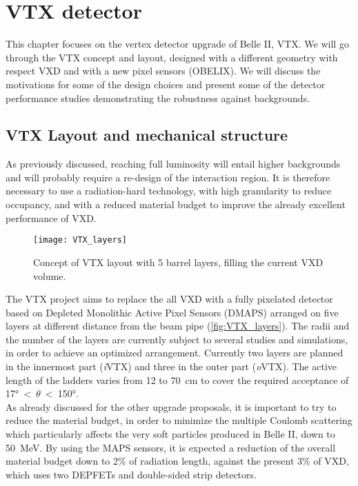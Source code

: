 \chapter{VTX detector} \label{ch:VTX}


This chapter focuses on the vertex detector upgrade of Belle II, VTX. We will go through the VTX concept and layout, designed with a different geometry with respect VXD and with a new pixel sensors (OBELIX). We will discuss the motivations for some of the design choices and present some of the detector performance studies demonstrating the robustness against backgrounds.


\section{VTX Layout and mechanical structure}

As previously discussed, reaching full luminosity will entail higher backgrounds and will probably require a re-design of the interaction region. It is therefore necessary to use a radiation-hard technology, with high granularity to reduce occupancy, and with a reduced material budget to improve the already excellent performance of VXD.


\begin{figure}[h!]
\centering
\texttt{[image: VTX\_layers]}
\caption{Concept of VTX layout with 5 barrel layers, filling the current VXD volume.}
\label{fig:VTX_layers}
\end{figure}


The VTX project aims to replace the all VXD with a fully pixelated detector based on Depleted Monolithic Active Pixel Sensors (DMAPS) arranged on five layers at different distance from the beam pipe (\autoref{fig:VTX_layers}). The radii and the number of the layers are currently subject to several  studies and simulations, in order to achieve an optimized arrangement. 
Currently two layers are planned in the innermost part (\textit{i}VTX) and three in the outer part (\textit{o}VTX). The active length of the ladders varies from 12 to \SI{70}{cm} to cover the required acceptance of \ang{17}~<~$\theta$~<~\ang{150}.\\
As already discussed for the other upgrade proposals, it is important to try to reduce the material budget, in order to minimize the multiple Coulomb scattering which particularly affects the very soft particles produced in Belle II, down to \SI{50}{MeV}. By using the MAPS sensors, it is expected a reduction of the overall material budget down to 2\% of radiation length, against the present 3\% of VXD, which uses two DEPFETs and double-sided strip detectors.


